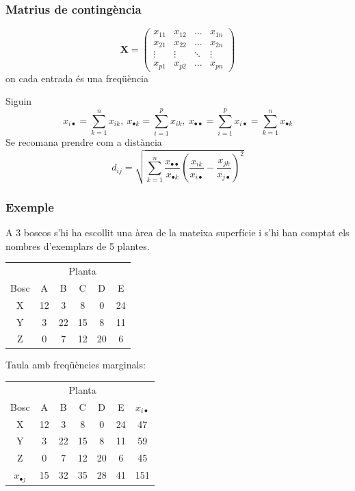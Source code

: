 \documentclass[12pt,t]{beamer}
\theoremstyle{plain}
\theoremstyle{definition}
\begin{document}
\begin{frame}
\frametitle{Matrius de contingència}
\vspace*{-3ex}

$$
\mathbf{X}=
\begin{pmatrix}
x_{11}&x_{12}&\ldots&x_{1n} \\ 
x_{21}&x_{22}&\ldots&x_{2n} \\
\vdots&\vdots&\ddots&\vdots \\
x_{p1}&x_{p2}&\ldots&x_{pn}
\end{pmatrix}
$$
on cada entrada és una freqüència
\medskip

Siguin
$$
x_{i\bullet}=\sum_{k=1}^n x_{ik},\
x_{\bullet k}=\sum_{i=1}^p x_{ik},\
x_{\bullet\bullet}=\sum_{i=1}^p  x_{i\bullet} = \sum_{k=1}^n x_{\bullet k}
$$
Se recomana prendre com a distància
$$
d_{ij}=\sqrt{\sum_{k=1}^n \frac{x_{\bullet\bullet}}{x_{\bullet k}} \left(\frac{x_{ik}}{x_{i\bullet}} - \frac{x_{jk}}{x_{j\bullet}}\right)^2}
$$

\end{frame}

\begin{frame}
\frametitle{Exemple}
\vspace*{-3ex}

A 3 boscos s'hi ha escollit una àrea de la mateixa superfície i s'hi han comptat els nombres d'exemplars de 5 plantes.
\begin{center}
\begin{tabular}{c|ccccc}
\multicolumn{1}{c}{} & \multicolumn{5}{c}{Planta}\\
Bosc & A & B & C & D & E \\ \hline
X & 12 & 3 & 8 & 0 & 24   \\
Y & 3 & 22 & 15 & 8 & 11   \\
Z & 0 & 7 & 12 & 20 & 6  \\
\end{tabular}
\end{center}
Taula amb freqüències marginals:
\begin{center}
\begin{tabular}{c|ccccc|c}
\multicolumn{1}{c}{} & \multicolumn{5}{c}{Planta} & \\
Bosc & A & B & C & D & E & $x_{i\bullet}$ \\ \hline
X & 12 & 3 & 8 & 0 & 24 & 47  \\
Y & 3 & 22 & 15 & 8 & 11  &  59  \\
Z & 0 & 7 & 12 & 20 & 6 & 45 \\\hline
$x_{\bullet j}$ & 15 & 32 & 35 & 28 & 41 & 151\\ \hline 
\end{tabular}
\end{center}




\end{frame}
\end{document}
